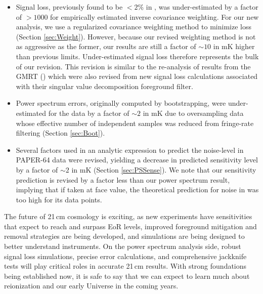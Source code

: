 \documentclass[preprint2,numberedappendix,tighten]{aastex6}
\begin{document}
\begin{itemize}
\item Signal loss, previously found to be $<2\%$ in , was under-estimated by a factor of $>$$1000$ for empirically estimated inverse 
covariance weighting. For our new analysis, we use a regularized covariance weighting method to minimize loss (Section 
\ref{sec:Weight}). However, because our revised weighting method is not as aggressive as the former, our results are still a 
factor of $\sim10$ in mK higher than previous limits. Under-estimated signal loss therefore represents the bulk of our revision. 
This revision is similar to the re-analysis of results from the GMRT (\citealt{paciga_et_al2013}) which were also 
revised from new signal loss calculations associated with their singular value decomposition foreground filter.
\item Power spectrum errors, originally computed by bootstrapping, were under-estimated for the data by a factor of $\sim2$ in mK due to oversampling data whose effective number of independent samples was reduced from fringe-rate filtering (Section \ref{sec:Boot}). 
\item Several factors used in an analytic expression to predict the noise-level in PAPER-64 data were revised, yielding a 
decrease in predicted sensitivity level by a factor of $\sim2$ in mK (Section \ref{sec:PSSense}). We note that our sensitivity prediction is revised by a factor less than our 
power spectrum result, implying that if taken at face value, the theoretical prediction for noise in  was too high for its data 
points.
\end{itemize}

The future of 21\,cm cosmology is exciting, as new experiments have sensitivities that expect to reach and surpass EoR levels, improved 
foreground mitigation and removal strategies are being developed, and simulations are being designed to better understand 
instruments. On the power spectrum analysis side, robust signal loss simulations, precise error calculations, and 
comprehensive jackknife tests will play critical roles in accurate 21\,cm results. With strong foundations being established now, it is safe to say that we can expect to learn much about reionization and our early Universe in the coming years.


\end{document}
